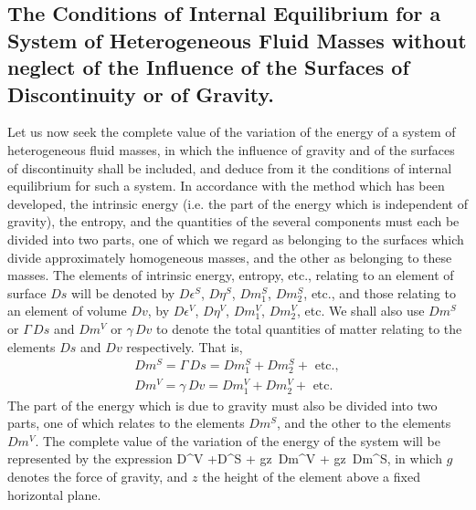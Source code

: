 \documentclass[12pt]{article}
\newcommand{\dd}{\delta}
\begin{document}
\subsection{The Conditions of Internal Equilibrium for a System of Heterogeneous Fluid Masses without neglect of the Influence of the Surfaces of Discontinuity or of Gravity.}
Let us now seek the complete value of the variation of the energy of a system of heterogeneous fluid masses, in which the influence of gravity and of the surfaces of discontinuity shall be included, and deduce from it the conditions of internal equilibrium for such a system. In accordance with the method which has been developed, the intrinsic energy (i.e. the part of the energy which is independent of gravity), the entropy, and the quantities of the several components must each be divided into two parts, one of which we regard as belonging to the surfaces which divide approximately homogeneous masses, and the other as belonging to these masses. The elements of intrinsic energy, entropy, etc., relating to an element of surface $Ds$ will be denoted by $D\epsilon^S$, $D\eta^S$, $Dm_1^S$, $Dm_2^S$, etc., and those relating to an element of volume $Dv$, by $D\epsilon^V$, $D\eta^V$, $Dm_1^V$, $Dm_2^V$, etc. We shall also use $Dm^S$ or $\Gamma \, Ds$ and $Dm^V$ or $\gamma \, Dv$ to denote the total quantities of matter relating to the elements $Ds$ and $Dv$ respectively. That is,
\begin{align}Dm^S = \Gamma \, Ds = Dm_1^S + Dm_2^S + \text{ etc.},  \label{597} \\
Dm^V = \gamma \, Dv = Dm_1^V + Dm_2^V+ \text{ etc.}       \label{598} \end{align}
The part of the energy which is due to gravity must also be divided into two parts, one of which relates to the elements $Dm^S$, and the other to the elements $Dm^V$. The complete value of the variation of the energy of the system will be represented by the expression
\eqs \dd \int D\epsilon^V +\dd \int D\epsilon^S + \dd \int gz\, Dm^V + \dd \int gz\, Dm^S,  \label{599} \eqe
in which $g$ denotes the force of gravity, and $z$ the height of the element above a fixed horizontal plane.
\end{document}
